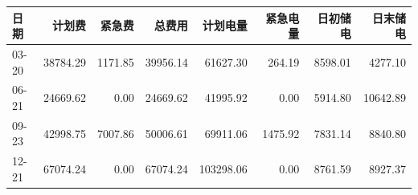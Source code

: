 \begin{tabular}{lrrrrrrr}
\toprule
日期 & 计划费 & 紧急费 & 总费用 & 计划电量 & 紧急电量 & 日初储电 & 日末储电 \\
\midrule
03-20 & 38784.29 & 1171.85 & 39956.14 & 61627.30 & 264.19 & 8598.01 & 4277.10 \\
06-21 & 24669.62 & 0.00 & 24669.62 & 41995.92 & 0.00 & 5914.80 & 10642.89 \\
09-23 & 42998.75 & 7007.86 & 50006.61 & 69911.06 & 1475.92 & 7831.14 & 8840.80 \\
12-21 & 67074.24 & 0.00 & 67074.24 & 103298.06 & 0.00 & 8761.59 & 8927.37 \\
\bottomrule
\end{tabular}